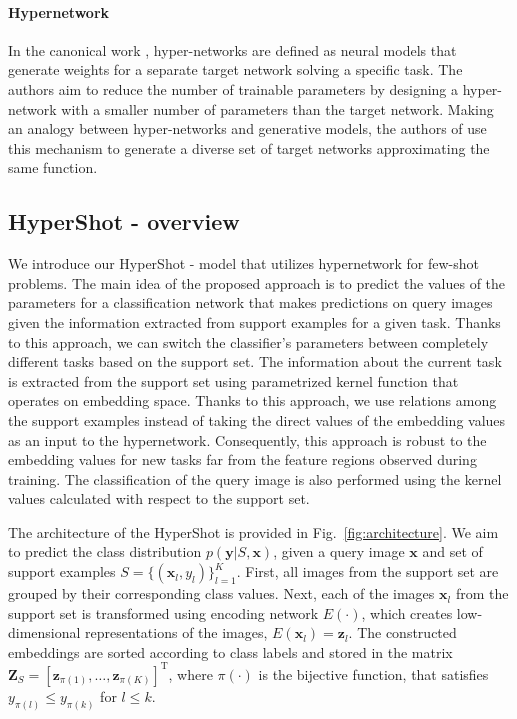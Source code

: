 \documentclass[nohyperref]{article}
\def\our{HyperShot}
\theoremstyle{plain}
\theoremstyle{definition}
\theoremstyle{remark}
\begin{document}
\paragraph{Hypernetwork}


In the canonical work \cite{ha2016hypernetworks}, hyper-networks are defined as neural models that generate weights for a separate target network solving a specific task.
The authors aim to reduce the number of trainable parameters by designing a hyper-network with a smaller number of parameters than the target network. Making an analogy between hyper-networks and generative models, the authors of \cite{sheikh2017stochastic} use this
mechanism to generate a diverse set of target networks approximating the same function. 


\subsection{\our{} - overview}

We introduce our {\our{}} - model that utilizes hypernetwork for few-shot problems. The main idea of the proposed approach is to predict the values of the parameters for a classification network that makes predictions on query images given the information extracted from support examples for a given task. Thanks to this approach, we can switch the classifier's parameters between completely different tasks based on the support set. The information about the current task is extracted from the support set using parametrized kernel function that operates on embedding space. Thanks to this approach, we use relations among the support examples instead of taking the direct values of the embedding values as an input to the hypernetwork. Consequently, this approach is robust to the embedding values for new tasks far from the feature regions observed during training. The classification of the query image is also performed using the kernel values calculated with respect to the support set.     

The architecture of the \our{} is provided in Fig.~\ref{fig:architecture}. We aim to predict the class distribution $p(\mathbf{y}|S, \mathbf{x})$, given a query image $\mathbf{x}$ and set of support examples $S = \{ (\mathbf{x}_l, y_l) \}_{l=1}^K$. First, all images from the support set are grouped by their corresponding class values. Next, each of the images $\mathbf{x}_l$ from the support set is transformed using encoding network $E(\cdot)$, which creates low-dimensional representations of the images, $E(\mathbf{x}_l)=\mathbf{z}_l$. The constructed embeddings are sorted according to class labels and stored in the matrix $\mathbf{Z}_S=[\mathbf{z}_{\pi(1)}, \dots, \mathbf{z}_{\pi(K)}]^\mathrm{T}$, where $\pi(\cdot)$ is the bijective function, that satisfies $y_{\pi(l)} \leq y_{\pi(k)}$ for $l \leq k$. 
\end{document}
